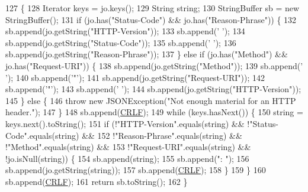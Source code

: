 \begin{DoxyCode}
127                                                                       \{
128         Iterator     keys = jo.keys();
129         String       string;
130         StringBuffer sb = \textcolor{keyword}{new} StringBuffer();
131         \textcolor{keywordflow}{if} (jo.has(\textcolor{stringliteral}{"Status-Code"}) && jo.has(\textcolor{stringliteral}{"Reason-Phrase"})) \{
132             sb.append(jo.getString(\textcolor{stringliteral}{"HTTP-Version"}));
133             sb.append(\textcolor{charliteral}{' '});
134             sb.append(jo.getString(\textcolor{stringliteral}{"Status-Code"}));
135             sb.append(\textcolor{charliteral}{' '});
136             sb.append(jo.getString(\textcolor{stringliteral}{"Reason-Phrase"}));
137         \} \textcolor{keywordflow}{else} \textcolor{keywordflow}{if} (jo.has(\textcolor{stringliteral}{"Method"}) && jo.has(\textcolor{stringliteral}{"Request-URI"})) \{
138             sb.append(jo.getString(\textcolor{stringliteral}{"Method"}));
139             sb.append(\textcolor{charliteral}{' '});
140             sb.append(\textcolor{charliteral}{'"'});
141             sb.append(jo.getString(\textcolor{stringliteral}{"Request-URI"}));
142             sb.append(\textcolor{charliteral}{'"'});
143             sb.append(\textcolor{charliteral}{' '});
144             sb.append(jo.getString(\textcolor{stringliteral}{"HTTP-Version"}));
145         \} \textcolor{keywordflow}{else} \{
146             \textcolor{keywordflow}{throw} \textcolor{keyword}{new} JSONException(\textcolor{stringliteral}{"Not enough material for an HTTP header."});
147         \}
148         sb.append(\hyperlink{classorg_1_1json_1_1_h_t_t_p_a7feb3304ccde0415ee29b8f997fb65b6}{CRLF});
149         \textcolor{keywordflow}{while} (keys.hasNext()) \{
150             \textcolor{keywordtype}{string} = keys.next().toString();
151             \textcolor{keywordflow}{if} (!\textcolor{stringliteral}{"HTTP-Version"}.equals(\textcolor{keywordtype}{string})      && !\textcolor{stringliteral}{"Status-Code"}.equals(\textcolor{keywordtype}{string}) &&
152                     !\textcolor{stringliteral}{"Reason-Phrase"}.equals(\textcolor{keywordtype}{string}) && !\textcolor{stringliteral}{"Method"}.equals(\textcolor{keywordtype}{string}) &&
153                     !\textcolor{stringliteral}{"Request-URI"}.equals(\textcolor{keywordtype}{string})   && !jo.isNull(\textcolor{keywordtype}{string})) \{
154                 sb.append(\textcolor{keywordtype}{string});
155                 sb.append(\textcolor{stringliteral}{": "});
156                 sb.append(jo.getString(\textcolor{keywordtype}{string}));
157                 sb.append(\hyperlink{classorg_1_1json_1_1_h_t_t_p_a7feb3304ccde0415ee29b8f997fb65b6}{CRLF});
158             \}
159         \}
160         sb.append(\hyperlink{classorg_1_1json_1_1_h_t_t_p_a7feb3304ccde0415ee29b8f997fb65b6}{CRLF});
161         \textcolor{keywordflow}{return} sb.toString();
162     \}
\end{DoxyCode}


